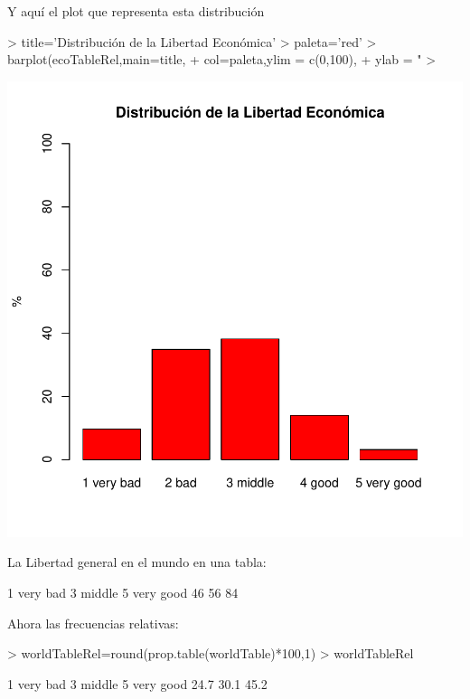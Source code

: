 \documentclass{article}
\begin{document}
Y aquí el plot que representa esta distribución
\begin{Schunk}
\begin{Sinput}
> title='Distribución de la Libertad Económica'
> paleta='red'
> barplot(ecoTableRel,main=title,
+         col=paleta,ylim = c(0,100),
+         ylab = "%
> 
\end{Sinput}
\end{Schunk}
\includegraphics{paperVersion_0-ecoTableRelPlot}


La Libertad general en el mundo en una tabla:
\begin{Schunk}
\begin{Soutput}
 1 very bad    3 middle 5 very good 
         46          56          84 
\end{Soutput}
\end{Schunk}


Ahora las frecuencias relativas:
\begin{Schunk}
\begin{Sinput}
> worldTableRel=round(prop.table(worldTable)*100,1)
> worldTableRel
\end{Sinput}
\begin{Soutput}
 1 very bad    3 middle 5 very good 
       24.7        30.1        45.2 
\end{Soutput}
\end{Schunk}
\end{document}
